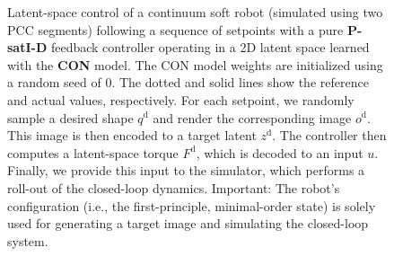 \begin{figure}[ht]
    \caption{Latent-space control of a continuum soft robot (simulated using two \gls{PCC} segments) following a sequence of setpoints with a pure \textbf{P-satI-D} feedback controller operating in a 2D latent space learned with the \textbf{\gls{CON}} model. The \gls{CON} model weights are initialized using a random seed of 0.
    The dotted and solid lines show the reference and actual values, respectively.
    For each setpoint, we randomly sample a desired shape $q^\mathrm{d}$ and render the corresponding image $o^\mathrm{d}$. This image is then encoded to a target latent $z^\mathrm{d}$. The controller then computes a latent-space torque $F^\mathrm{d}$, which is decoded to an input $u$. Finally, we provide this input to the simulator, which performs a roll-out of the closed-loop dynamics.
    Important: The robot's configuration (i.e., the first-principle, minimal-order state) is solely used for generating a target image and simulating the closed-loop system. 
    }\label{fig:apx-con:control:pcc_ns-2:con_PsatID_results}
\end{figure}



